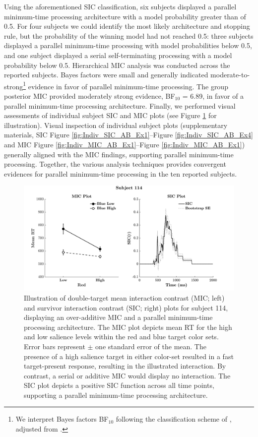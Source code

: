 Using the aforementioned SIC classification, six subjects displayed a parallel minimum-time processing architecture with a model probability greater than of 0.5. For four subjects we could identify the most likely architecture and stopping rule, but the probability of the winning model had not reached 0.5: three subjects displayed a parallel minimum-time processing  with model probabilities below 0.5, and one subject displayed a serial self-terminating processing  with a model probability below 0.5. Hierarchical MIC analysis was conducted across the reported subjects. Bayes factors were small and generally indicated moderate-to-strong\footnote{We interpret Bayes factors BF$_{10}$ following the classification scheme of , adjusted from .} evidence in favor of parallel minimum-time processing. The group posterior MIC provided moderately strong evidence, BF$_{10}$ = 6.89, in favor of a parallel minimum-time processing architecture. Finally, we performed visual assessments of individual subject SIC and MIC plots (see Figure \ref{fig:EgSIC} for illustration). Visual inspection of individual subject plots (supplementary materials, SIC Figure \ref{fig:Indiv_SIC_AB_Ex1}--Figure \ref{fig:Indiv_SIC_AB_Ex4} and MIC Figure \ref{fig:Indiv_MIC_AB_Ex1}--Figure \ref{fig:Indiv_MIC_AB_Ex1}) generally aligned with the MIC findings, supporting parallel minimum-time processing. Together, the various analysis techniques provides convergent evidences for parallel minimum-time processing in the ten reported subjects. 

\begin{figure}[hbt]
\centering \includegraphics[width=\linewidth]{Figures/EstSystems/FIG11JPG.jpg}
\caption{Illustration of double-target mean interaction contrast (MIC; left) and survivor interaction contrast (SIC; right) plots for subject 114, displaying an over-additive MIC and a parallel minimum-time processing architecture. The MIC plot depicts mean RT for the high and low salience levels within the red and blue target color sets. Error bars represent $\pm$ one standard error of the mean. The presence of a high salience target in either color-set resulted in a fast target-present response, resulting in the illustrated interaction. By contrast, a serial or additive MIC would display no interaction. The SIC plot depicts a positive SIC function across all time points, supporting a parallel minimum-time processing architecture.}
\label{fig:EgSIC}
\end{figure}

